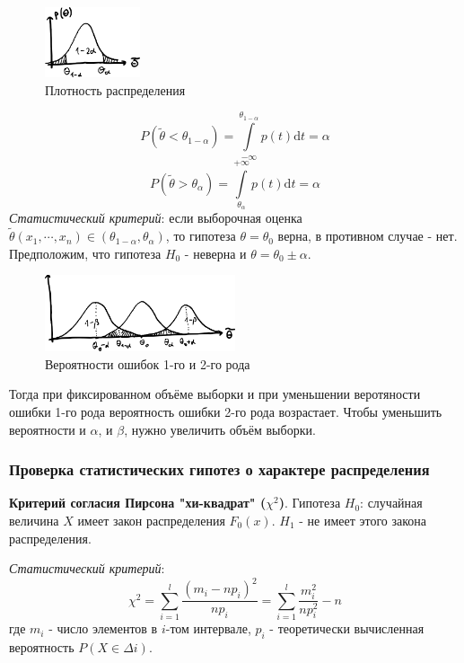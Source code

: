 \documentclass[12pt, a4paper]{article}
\newcommand{\di}{\mathrm{d}}
\begin{document}
\begin{figure}
  \centering
  \vspace{-8mm}  
  \includegraphics[width=0.25\textwidth]{07}
  \vspace{-9mm}
  \caption{Плотность распределения}
\end{figure}
\[P(\tilde{\theta} < \theta_{1-\alpha}) = \int \limits_{-\infty}^{\theta_{1-\alpha}} p(t) \di t = \alpha \]
\[P(\tilde{\theta} > \theta_{\alpha}) = \int \limits_{\theta_{\alpha}}^{+\infty} p(t) \di t = \alpha \]
\textit{Статистический критерий}: если выборочная оценка $\tilde{\theta} (x_1, \cdots, x_n) \in (\theta_{1-\alpha}, \theta_{\alpha})$, то гипотеза $\theta = \theta_0$ верна, в противном случае - нет. Предположим, что гипотеза $H_0$ - неверна и $\theta = \theta_0 \pm \alpha$.

\begin{figure}[h]
 \centering
 \includegraphics[width=0.5\textwidth]{08}
 \vspace{-4mm}
 \caption{Вероятности ошибок 1-го и 2-го рода}
\end{figure}

Тогда при фиксированном объёме выборки и при уменьшении веротяности ошибки 1-го рода вероятность ошибки 2-го рода возрастает. Чтобы уменьшить вероятности и $\alpha$, и $\beta$, нужно увеличить объём выборки.

\subsubsection{Проверка статистических гипотез о характере распределения}

\textbf{Критерий согласия Пирсона "хи-квадрат" ($\chi^2$)}. Гипотеза $H_0$: случайная величина $X$ имеет закон распределения $F_0(x)$. $H_1$ - не имеет этого закона распределения.

\textit{Статистический критерий}:
\[\chi^2 = \sum_{i=1}^l \frac{(m_i-np_i)^2}{np_i} = \sum_{i=1}^l \frac{m_i^2}{np_i^2} - n \]
где $m_i$ - число элементов в $i$-том интервале, $p_i$ - теоретически вычисленная вероятность $P(X \in \Delta i)$.
\end{document}
